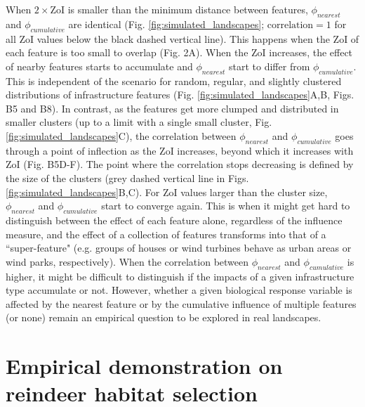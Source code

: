 \documentclass[titlepage]{article}
\begin{document}
When $2 \times \text{ZoI}$ is smaller than the minimum distance between features, $\phi_{nearest}$ and $\phi_{cumulative}$ are identical (Fig. \ref{fig:simulated_landscapes}; $\text{correlation} = 1$ for all ZoI values below the black dashed vertical line). This happens when the ZoI of each feature is too small to overlap (Fig. 2A). When the ZoI increases, the effect of nearby features starts to accumulate and $\phi_{nearest}$ start to differ from $\phi_{cumulative}$. This is independent of the scenario for random, regular, and slightly clustered distributions of infrastructure features (Fig. \ref{fig:simulated_landscapes}A,B, Figs. B5 and B8). In contrast, as the features get more clumped and distributed in smaller clusters (up to a limit with a single small cluster, Fig. \ref{fig:simulated_landscapes}C), the correlation between $\phi_{nearest}$ and $\phi_{cumulative}$ goes through a point of inflection as the ZoI increases, beyond which it increases with ZoI (Fig. B5D-F). The point where the correlation stops decreasing is defined by the size of the clusters (grey dashed vertical line in Figs. \ref{fig:simulated_landscapes}B,C). For ZoI values larger than the cluster size, $\phi_{nearest}$ and $\phi_{cumulative}$ start to converge again. %
This is when it might get hard to distinguish between the effect of each feature alone, regardless of the influence measure, and the effect of a collection of features transforms into that of a ``super-feature" (e.g. groups of houses or wind turbines behave as urban areas or wind parks, respectively). 
When the correlation between $\phi_{nearest}$ and $\phi_{cumulative}$ is higher, it might be difficult to distinguish if the impacts of a given infrastructure type accumulate or not. 
However, whether a given biological response variable is affected by the nearest feature or by the cumulative influence of multiple features (or none) remain an empirical question to be explored in real landscapes. 

\section{Empirical demonstration on reindeer habitat selection}
\end{document}
